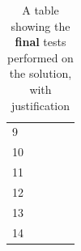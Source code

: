 \documentclass[9pt]{article}
\begin{document}
\begin{table}[H]
\begin{tabularx}{\textwidth}{lXlXX}
		9                                                                                   &                               &                    &                                &                                \\
		10                                                                                  &                               &                    &                                &                                \\
		11                                                                                  &                               &                    &                                &                                \\
		12                                                                                  &                               &                    &                                &                                \\
		13                                                                                  &                               &                    &                                &                                \\
		14                                                                                  &                               &                    &                                &                                \\ \bottomrule
	\end{tabularx}
	\caption{A table showing the \textbf{final} tests performed on the solution, with justification}
	\label{tab_testingDesignSolutionFinal}
\end{table}


















\newpage
\end{document}
